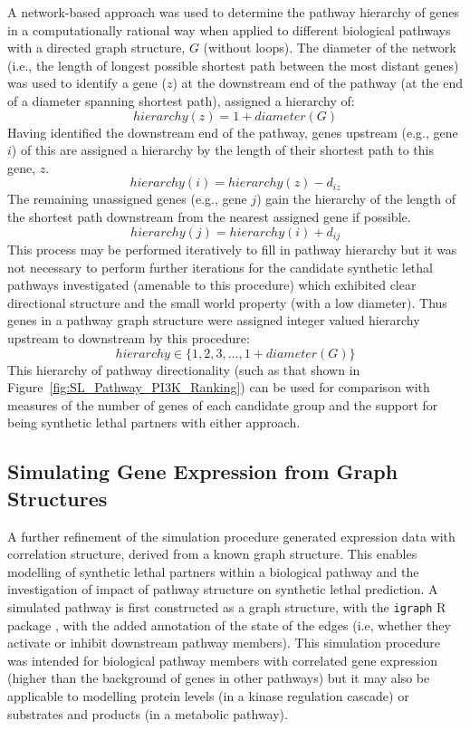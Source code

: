 A network-based approach was used to determine the pathway hierarchy of genes in a computationally rational way when applied to different biological pathways with a directed graph structure, $G$ (without loops). The diameter of the network (i.e., the length of longest possible shortest path between the most distant genes) was used to identify a gene ($z$) at the downstream end of the pathway (at the end of a diameter spanning shortest path), assigned a hierarchy of: $$hierarchy(z) = 1 + diameter(G)$$ Having identified the downstream end of the pathway, genes upstream (e.g., gene $i$) of this are assigned a hierarchy by the length of their shortest path to this gene, $z$. $$hierarchy(i) = hierarchy(z) - d_{iz}$$ The remaining unassigned genes (e.g., gene $j$) gain the hierarchy of the length of the shortest path downstream from the nearest assigned gene if possible. $$hierarchy(j) = hierarchy(i) + d_{ij}$$ This process may be performed iteratively to fill in pathway hierarchy but it was not necessary to perform further iterations for the candidate synthetic lethal pathways investigated (amenable to this procedure) which exhibited clear directional structure and the small world property (with a low diameter). Thus genes in a pathway graph structure were assigned integer valued hierarchy upstream to downstream by this procedure: $$hierarchy \in \{1, 2, 3, ..., 1 + diameter(G)\}$$
This hierarchy of pathway directionality (such as that shown in Figure~\ref{fig:SL_Pathway_PI3K_Ranking}) can be used for comparison with measures of the number of genes of each candidate group and the support for being synthetic lethal partners with either approach.

\subsection{Simulating Gene Expression from Graph Structures} \label{methods:graphsim}
A further refinement of the simulation procedure generated expression data with correlation structure, derived from a known graph structure. %
This enables modelling of synthetic lethal partners within a biological pathway and the investigation of impact of pathway structure on synthetic lethal prediction. A simulated pathway is first constructed as a graph structure, with the \texttt{igraph} R package \citet{igraph}, with the added annotation of the state of the edges (i.e, whether they activate or inhibit downstream pathway members). This simulation procedure was intended for biological pathway members with correlated gene expression (higher than the background of genes in other pathways) but it may also be applicable to modelling protein levels (in a kinase regulation cascade) or substrates and products (in a metabolic pathway).%

